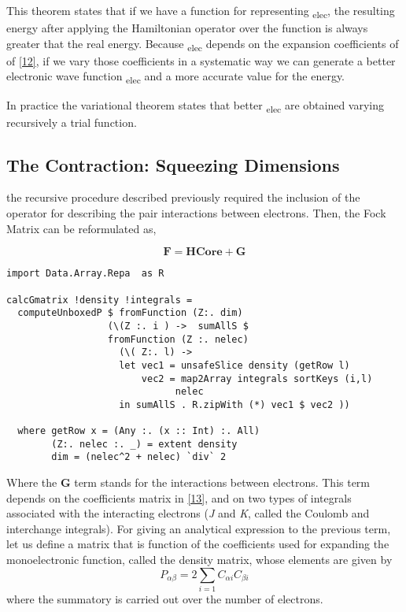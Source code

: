 \documentclass{tmr}
\begin{document}
This theorem states that if we have a function for representing \textPhi\textsubscript{elec},
the resulting energy after applying the Hamiltonian operator over the function is always greater
that the real energy. Because  \textPhi\textsubscript{elec} depends on the expansion coefficients of
 of \eqref{12}, if we vary those coefficients in a systematic way we can generate 
a better electronic wave function \textPhi\textsubscript{elec} and a more accurate value
for the energy.

In practice the variational theorem states that better \textPhi\textsubscript{elec} are
obtained varying recursively a trial function.

\subsection{The Contraction: Squeezing Dimensions}

the recursive procedure described previously required the inclusion of the operator
for describing the pair interactions between electrons. Then, the Fock Matrix can
be reformulated as,

\begin{equation}\label{22}
 \mathbf{F} = \mathbf{HCore} + \mathbf{G}
\end{equation}

\begin{lstlisting}[float,captionpos=b,belowcaptionskip=4pt, caption= Computation of the  G matrix]
import Data.Array.Repa  as R

calcGmatrix !density !integrals =
  computeUnboxedP $ fromFunction (Z:. dim)
                  (\(Z :. i ) ->  sumAllS $
                  fromFunction (Z :. nelec)
                    (\( Z:. l) ->
                    let vec1 = unsafeSlice density (getRow l)
                        vec2 = map2Array integrals sortKeys (i,l)
                              nelec
                    in sumAllS . R.zipWith (*) vec1 $ vec2 ))

  where getRow x = (Any :. (x :: Int) :. All)
        (Z:. nelec :. _) = extent density
        dim = (nelec^2 + nelec) `div` 2

\end{lstlisting}

Where the \textbf{G} term stands for the interactions between electrons.
This term depends on the coefficients matrix in \eqref{13},
and on two types of integrals associated with the interacting electrons 
(\textit{J} and \textit{K}, called the Coulomb and interchange integrals).
For giving an analytical expression to the previous term, let us define 
a matrix that is function of the coefficients used for expanding the
monoelectronic function, called the density matrix, whose elements
are given by
\begin{equation}\label{23}
 P_{\alpha \beta} = 2\sum_{i=1} C_{\alpha i} C_{\beta i}
\end{equation}
where the summatory is carried out over the number of electrons.
\end{document}

